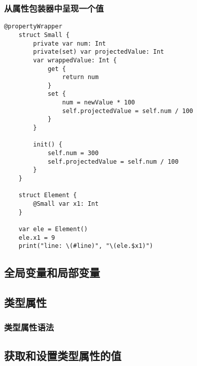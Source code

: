 \documentclass{../main.tex}{subfiles}
\begin{document}
\subsubsection{从属性包装器中呈现一个值}
\begin{lstlisting}[style = lstCodeStyleSwift, caption = {从属性包装器中呈现一个值}]
    @propertyWrapper
    struct Small {
        private var num: Int
        private(set) var projectedValue: Int
        var wrappedValue: Int {
            get {
                return num
            }
            set {
                num = newValue * 100
                self.projectedValue = self.num / 100
            }
        }
    
        init() {
            self.num = 300
            self.projectedValue = self.num / 100
        }
    }
    
    struct Element {
        @Small var x1: Int
    }
    
    var ele = Element()
    ele.x1 = 9
    print("line: \(#line)", "\(ele.$x1)")    
\end{lstlisting}

\subsection{全局变量和局部变量}
\subsection{类型属性}
\subsubsection{类型属性语法}
\subsection{获取和设置类型属性的值}
\end{document}
